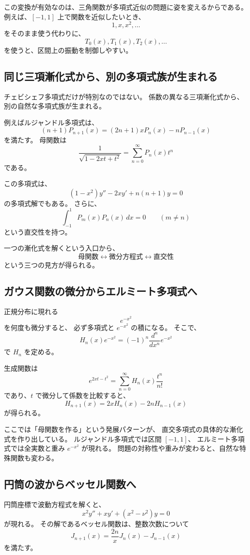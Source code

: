 この変換が有効なのは、三角関数が多項式近似の問題に姿を変えるからである。
例えば、$[-1,1]$ 上で関数を近似したいとき、
\[
  1,x,x^2,\ldots
\]
をそのまま使う代わりに、
\[
  T_0(x),T_1(x),T_2(x),\ldots
\]
を使うと、区間上の振動を制御しやすい。

\subsection{同じ三項漸化式から、別の多項式族が生まれる}

チェビシェフ多項式だけが特別なのではない。
係数の異なる三項漸化式から、別の自然な多項式族が生まれる。

例えばルジャンドル多項式は、
\[
  (n+1)P_{n+1}(x)
  =(2n+1)xP_n(x)-nP_{n-1}(x)
\]
を満たす。
母関数は
\[
  \frac1{\sqrt{1-2xt+t^2}}
  =\sum_{n=0}^{\infty}P_n(x)t^n
\]
である。

この多項式は、
\[
  (1-x^2)y''-2xy'+n(n+1)y=0
\]
の多項式解でもある。
さらに、
\[
  \int_{-1}^{1}P_m(x)P_n(x)\,dx=0
  \qquad(m\neq n)
\]
という直交性を持つ。

一つの漸化式を解くという入口から、
\[
  \text{母関数}
  \longleftrightarrow
  \text{微分方程式}
  \longleftrightarrow
  \text{直交性}
\]
という三つの見方が得られる。

\subsection{ガウス関数の微分からエルミート多項式へ}

正規分布に現れる
\[
  e^{-x^2}
\]
を何度も微分すると、
必ず多項式と $e^{-x^2}$ の積になる。
そこで、
\[
  H_n(x)e^{-x^2}
  =(-1)^n\frac{d^n}{dx^n}e^{-x^2}
\]
で $H_n$ を定める。

生成関数は
\[
  e^{2xt-t^2}
  =\sum_{n=0}^{\infty}H_n(x)\frac{t^n}{n!}
\]
であり、$t$ で微分して係数を比較すると、
\[
  H_{n+1}(x)=2xH_n(x)-2nH_{n-1}(x)
\]
が得られる。

ここでは「母関数を作る」という発展パターンが、
直交多項式の具体的な漸化式を作り出している。
ルジャンドル多項式では区間 $[-1,1]$、
エルミート多項式では全実数と重み $e^{-x^2}$ が現れる。
問題の対称性や重みが変わると、自然な特殊関数も変わる。

\subsection{円筒の波からベッセル関数へ}

円筒座標で波動方程式を解くと、
\[
  x^2y''+xy'+(x^2-\nu^2)y=0
\]
が現れる。
その解であるベッセル関数は、整数次数について
\[
  J_{n+1}(x)
  =\frac{2n}{x}J_n(x)-J_{n-1}(x)
\]
を満たす。

